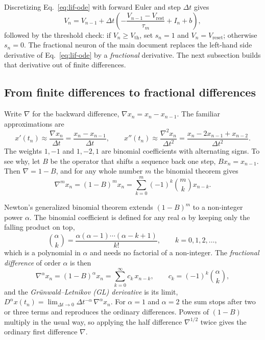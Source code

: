 \documentclass[11pt,a4paper]{article}
\newcommand{\Vth}{V_{\mathrm{th}}}
\newcommand{\Vrest}{V_{\mathrm{rest}}}
\newcommand{\Vreset}{V_{\mathrm{reset}}}
\begin{document}
Discretizing Eq.~\eqref{eq:lif-ode} with forward Euler and step $\Delta t$ gives
\begin{equation}
V_n = V_{n-1} + \Delta t \left( -\frac{V_{n-1} - \Vrest}{\tau_m} + I_n + b \right),
\label{eq:lif-euler}
\end{equation}
followed by the threshold check: if $V_n \ge \Vth$, set $s_n = 1$ and $V_n = \Vreset$; otherwise $s_n = 0$. The fractional neuron of the main document replaces the left-hand side derivative of Eq.~\eqref{eq:lif-ode} by a \emph{fractional} derivative. The next subsection builds that derivative out of finite differences.

\subsection{From finite differences to fractional differences}

Write $\nabla$ for the backward difference, $\nabla x_n = x_n - x_{n-1}$. The familiar approximations are
\begin{equation*}
x'(t_n) \approx \frac{\nabla x_n}{\Delta t} = \frac{x_n - x_{n-1}}{\Delta t}, \qquad
x''(t_n) \approx \frac{\nabla^2 x_n}{\Delta t^2} = \frac{x_n - 2x_{n-1} + x_{n-2}}{\Delta t^2}.
\end{equation*}
The weights $1, -1$ and $1, -2, 1$ are binomial coefficients with alternating signs. To see why, let $B$ be the operator that shifts a sequence back one step, $B x_n = x_{n-1}$. Then $\nabla = 1 - B$, and for any whole number $m$ the binomial theorem gives
\begin{equation*}
\nabla^m x_n = (1 - B)^m x_n = \sum_{k=0}^{m} (-1)^k \binom{m}{k} x_{n-k}.
\end{equation*}

Newton's generalized binomial theorem extends $(1 - B)^m$ to a non-integer power $\alpha$. The binomial coefficient is defined for any real $\alpha$ by keeping only the falling product on top,
\begin{equation*}
\binom{\alpha}{k} = \frac{\alpha(\alpha-1)\cdots(\alpha-k+1)}{k!}, \qquad k = 0, 1, 2, \dots,
\end{equation*}
which is a polynomial in $\alpha$ and needs no factorial of a non-integer. The \emph{fractional difference} of order $\alpha$ is then
\begin{equation}
\nabla^{\alpha} x_n = (1 - B)^{\alpha} x_n = \sum_{k=0}^{\infty} c_k\, x_{n-k}, \qquad c_k = (-1)^k \binom{\alpha}{k},
\label{eq:fracdiff}
\end{equation}
and the \emph{Gr\"unwald--Letnikov (GL) derivative} is its limit, $D^{\alpha} x(t_n) = \lim_{\Delta t \to 0} \Delta t^{-\alpha}\, \nabla^{\alpha} x_n$. For $\alpha = 1$ and $\alpha = 2$ the sum stops after two or three terms and reproduces the ordinary differences. Powers of $(1-B)$ multiply in the usual way, so applying the half difference $\nabla^{1/2}$ twice gives the ordinary first difference $\nabla$.
\end{document}
